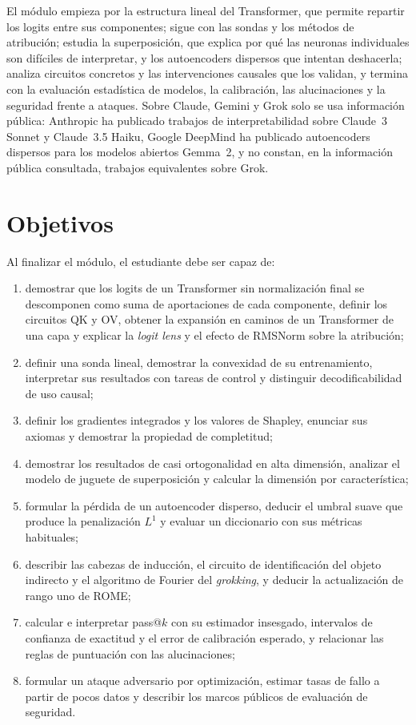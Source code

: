 \documentclass[11pt,a4paper,twoside,openany]{book}
\begin{document}
El módulo empieza por la estructura lineal del Transformer, que permite repartir los logits entre sus componentes; sigue con las sondas y los métodos de atribución; estudia la superposición, que explica por qué las neuronas individuales son difíciles de interpretar, y los autoencoders dispersos que intentan deshacerla; analiza circuitos concretos y las intervenciones causales que los validan, y termina con la evaluación estadística de modelos, la calibración, las alucinaciones y la seguridad frente a ataques. Sobre Claude, Gemini y Grok solo se usa información pública: Anthropic ha publicado trabajos de interpretabilidad sobre Claude~3 Sonnet y Claude~3.5 Haiku, Google DeepMind ha publicado autoencoders dispersos para los modelos abiertos Gemma~2, y no constan, en la información pública consultada, trabajos equivalentes sobre Grok.

\section*{Objetivos}
Al finalizar el módulo, el estudiante debe ser capaz de:
\begin{enumerate}[label=\arabic*.]
  \item demostrar que los logits de un Transformer sin normalización final se descomponen como suma de aportaciones de cada componente, definir los circuitos QK y OV, obtener la expansión en caminos de un Transformer de una capa y explicar la \emph{logit lens} y el efecto de RMSNorm sobre la atribución;
  \item definir una sonda lineal, demostrar la convexidad de su entrenamiento, interpretar sus resultados con tareas de control y distinguir decodificabilidad de uso causal;
  \item definir los gradientes integrados y los valores de Shapley, enunciar sus axiomas y demostrar la propiedad de completitud;
  \item demostrar los resultados de casi ortogonalidad en alta dimensión, analizar el modelo de juguete de superposición y calcular la dimensión por característica;
  \item formular la pérdida de un autoencoder disperso, deducir el umbral suave que produce la penalización $L^{1}$ y evaluar un diccionario con sus métricas habituales;
  \item describir las cabezas de inducción, el circuito de identificación del objeto indirecto y el algoritmo de Fourier del \emph{grokking}, y deducir la actualización de rango uno de ROME;
  \item calcular e interpretar pass@$k$ con su estimador insesgado, intervalos de confianza de exactitud y el error de calibración esperado, y relacionar las reglas de puntuación con las alucinaciones;
  \item formular un ataque adversario por optimización, estimar tasas de fallo a partir de pocos datos y describir los marcos públicos de evaluación de seguridad.
\end{enumerate}
\end{document}
